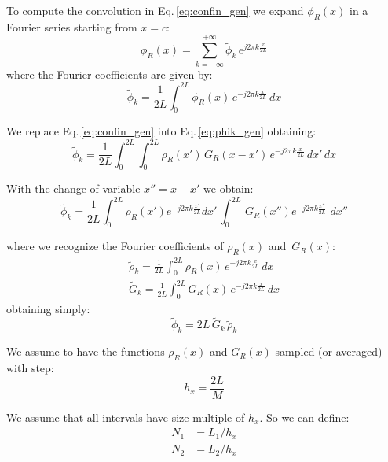 To compute the convolution in Eq.\,\ref{eq:confin_gen} we expand $\phi_{R}(x)$ in a Fourier series starting from $x=c$:
\begin{equation}
\phi_{R}(x) = \sum_{k=-\infty}^{+\infty} \tilde{\phi}_k\, e^{j2\pi k \frac{x}{2L}}
\label{eq:phifour_gen}
\end{equation}
where the Fourier coefficients are given by:
\begin{equation}
\tilde{\phi}_k = \frac{1}{2L}\int_0^{2L} \phi_{R}(x)\, e^{-j2\pi k \frac{x}{2L}} \, dx
\label{eq:phik_gen}
\end{equation}

We replace Eq.\,\eqref{eq:confin_gen} into Eq.\,\eqref{eq:phik_gen} obtaining:
\begin{equation}
\tilde{\phi}_k = \frac{1}{2L}\int_0^{2L} \int_{0 }^{2L} 
\rho_{R}(x')\,G_{R}(x-x') \, e^{-j2\pi k \frac{x}{2L}} \,  dx'\, dx
\end{equation}

With the change of variable $x'' = x-x'$ we obtain:
\begin{equation}
\tilde{\phi}_k = 
\frac{1}{2L}
\int_0^{2L} 
\rho_{R}(x') e^{-j2\pi k \frac{x'}{2L}}dx'\,
\int_{0 }^{2L} 
\,G_{R}(x'') e^{-j2\pi k \frac{x''}{2L}}\,  \,  dx''
\end{equation}

where we recognize the Fourier coefficients of $\rho_{R}(x)$ and $\,G_{R}(x)$:
\begin{align}
\tilde{\rho}_k = \frac{1}{2L}\int_0^{2L} \rho_{R}(x)\, e^{-j2\pi k \frac{x}{2L}} \, dx \label{eq:rhok_gen}\\
\tilde{G}_k = \frac{1}{2L}\int_0^{2L} G_{R}(x)\, e^{-j2\pi k \frac{x}{2L}} \, dx \label{eq:Gk_gen}
\end{align}
obtaining simply:
\begin{equation}
\tilde{\phi}_k = 2L \, \tilde{G}_k \, \tilde{\rho}_k
\label{eq:freqconv_gen}
\end{equation}

We assume to have the functions $\rho_{R}(x)$ and  $G_{R}(x)$ sampled (or averaged) with step:
\begin{equation}
h_x = \frac{2L}{M}
\end{equation}

We assume that all intervals have size multiple of $h_x$. So we can define:
\begin{align}
N_1 &= L_1 / h_x\\
N_2 &= L_2 / h_x
\end{align}

